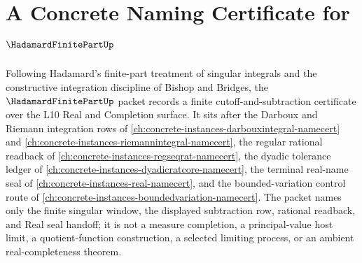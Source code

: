 \chapter{A Concrete Naming Certificate for $\HadamardFinitePartUp$}
\label{ch:concrete-instances-hadamard-finite-part-namecert}

Following Hadamard's finite-part treatment of singular integrals and the constructive integration discipline of Bishop and Bridges, the $\HadamardFinitePartUp$ packet records a finite cutoff-and-subtraction certificate over the L10 Real and Completion surface. It sits after the Darboux and Riemann integration rows of \autoref{ch:concrete-instances-darbouxintegral-namecert} and \autoref{ch:concrete-instances-riemannintegral-namecert}, the regular rational readback of \autoref{ch:concrete-instances-regseqrat-namecert}, the dyadic tolerance ledger of \autoref{ch:concrete-instances-dyadicratcore-namecert}, the terminal real-name seal of \autoref{ch:concrete-instances-real-namecert}, and the bounded-variation control route of \autoref{ch:concrete-instances-boundedvariation-namecert}. The packet names only the finite singular window, the displayed subtraction row, rational readback, and Real seal handoff; it is not a measure completion, a principal-value host limit, a quotient-function construction, a selected limiting process, or an ambient real-completeness theorem.

